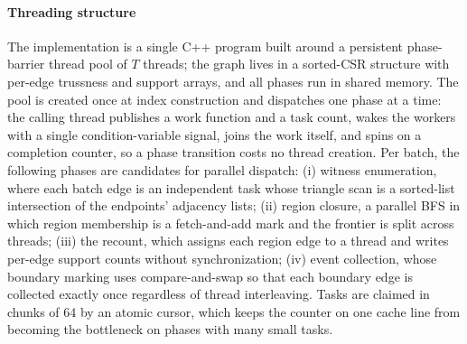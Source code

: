 \label{sec:parallel}

\paragraph{Threading structure}
The implementation is a single C++ program built around a persistent phase-barrier thread pool of $T$ threads; the graph lives in a sorted-CSR structure with per-edge trussness and support arrays, and all phases run in shared memory.
The pool is created once at index construction and dispatches one phase at a time: the calling thread publishes a work function and a task count, wakes the workers with a single condition-variable signal, joins the work itself, and spins on a completion counter, so a phase transition costs no thread creation.
Per batch, the following phases are candidates for parallel dispatch:
(i) witness enumeration, where each batch edge is an independent task whose triangle scan is a sorted-list intersection of the endpoints' adjacency lists;
(ii) region closure, a parallel BFS in which region membership is a fetch-and-add mark and the frontier is split across threads;
(iii) the recount, which assigns each region edge to a thread and writes per-edge support counts without synchronization;
(iv) event collection, whose boundary marking uses compare-and-swap so that each boundary edge is collected exactly once regardless of thread interleaving.
Tasks are claimed in chunks of 64 by an atomic cursor, which keeps the counter on one cache line from becoming the bottleneck on phases with many small tasks.

